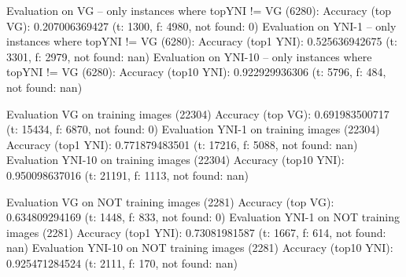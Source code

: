 Evaluation on VG -- only instances where topYNI != VG (6280):
Accuracy (top VG): 0.207006369427 (t: 1300, f: 4980, not found: 0)
Evaluation on YNI-1 -- only instances where topYNI != VG (6280):
Accuracy (top1 YNI): 0.525636942675 (t: 3301, f: 2979, not found: nan)
Evaluation on YNI-10 -- only instances where topYNI != VG (6280):
Accuracy (top10 YNI): 0.922929936306 (t: 5796, f: 484, not found: nan)

Evaluation VG on training images (22304)
Accuracy (top VG): 0.691983500717 (t: 15434, f: 6870, not found: 0)
Evaluation YNI-1 on training images (22304)
Accuracy (top1 YNI): 0.771879483501 (t: 17216, f: 5088, not found: nan)
Evaluation YNI-10 on training images (22304)
Accuracy (top10 YNI): 0.950098637016 (t: 21191, f: 1113, not found: nan)

Evaluation VG on NOT training images (2281)
Accuracy (top VG): 0.634809294169 (t: 1448, f: 833, not found: 0)
Evaluation YNI-1 on NOT training images (2281)
Accuracy (top1 YNI): 0.73081981587 (t: 1667, f: 614, not found: nan)
Evaluation YNI-10 on NOT training images (2281)
Accuracy (top10 YNI): 0.925471284524 (t: 2111, f: 170, not found: nan)

\fi

